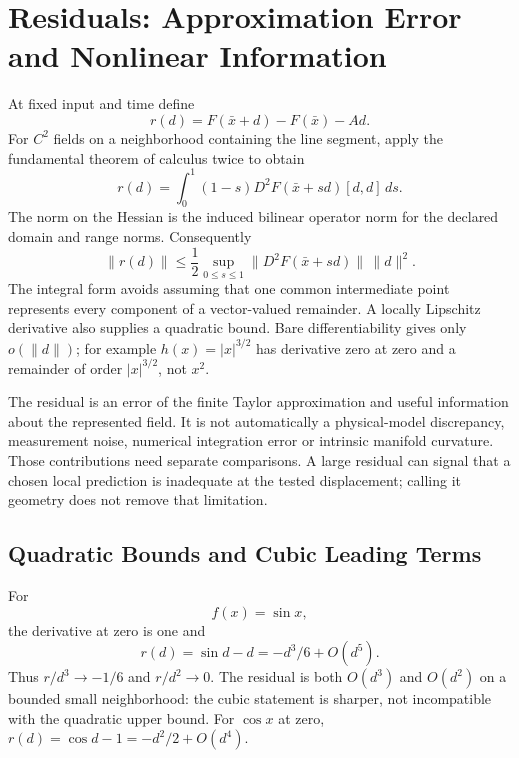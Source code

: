 \section{Residuals: Approximation Error and Nonlinear Information}

At fixed input and time define
\begin{equation}
r(d)=F(\bar x+d)-F(\bar x)-Ad.
\label{eq:ch1:residual-def}
\end{equation}
For $C^2$ fields on a neighborhood containing the line segment, apply the fundamental theorem
of calculus twice to obtain
\[
r(d)=\int_0^1(1-s)D^2F(\bar x+sd)[d,d]\,ds.
\]
The norm on the Hessian is the induced bilinear operator norm for the declared domain and
range norms. Consequently
\begin{equation}
\|r(d)\|\leq\frac12\sup_{0\leq s\leq1}\|D^2F(\bar x+sd)\|\,\|d\|^2.
\label{eq:ch1:residual-bound}
\end{equation}
The integral form avoids assuming that one common intermediate point represents every
component of a vector-valued remainder. A locally Lipschitz derivative also supplies a
quadratic bound. Bare differentiability gives only $o(\|d\|)$; for example $h(x)=|x|^{3/2}$
has derivative zero at zero and a remainder of order $|x|^{3/2}$, not $x^2$.

The residual is an error of the finite Taylor approximation and useful information about
the represented field. It is not automatically a physical-model discrepancy, measurement
noise, numerical integration error or intrinsic manifold curvature. Those contributions
need separate comparisons. A large residual can signal that a chosen local prediction is
inadequate at the tested displacement; calling it geometry does not remove that limitation.

\subsection{Quadratic Bounds and Cubic Leading Terms}

For
\begin{equation}
f(x)=\sin x,
\label{eq:ch1:sin-example}
\end{equation}
the derivative at zero is one and
\begin{equation}
r(d)=\sin d-d=-d^3/6+O(d^5).
\label{eq:ch1:sin-residual}
\end{equation}
Thus $r/d^3\to-1/6$ and $r/d^2\to0$. The residual is both $O(d^3)$ and $O(d^2)$ on
a bounded small neighborhood: the cubic statement is sharper, not incompatible with the
quadratic upper bound. For $\cos x$ at zero, $r(d)=\cos d-1=-d^2/2+O(d^4)$.

